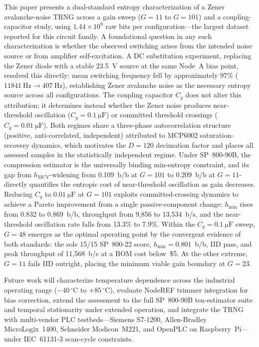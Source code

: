 \documentclass[conference]{IEEEtran}
\newcommand{\hmin}{\ensuremath{h_{\min}}}
\newcommand{\Cg}{\ensuremath{C_g}}
\newcommand{\degC}{\ensuremath{^{\circ}\mathrm{C}}}
\begin{document}
This paper presents a dual-standard entropy characterization of a
Zener avalanche-noise TRNG across a gain sweep ($G=11$ to $G=101$)
and a coupling-capacitor study, using $1.44\!\times\!10^{9}$ raw bits
per configuration---the largest dataset reported for this circuit
family. A foundational question in any such characterization is
whether the observed switching arises from the intended noise source
or from amplifier self-excitation. A DC substitution experiment,
replacing the Zener diode with a stable \SI{23.5}{\volt} source at the
same Node~A bias point, resolved this directly: mean switching
frequency fell by approximately 97\%
($\SI{11841}{\hertz}\to\SI{407}{\hertz}$), establishing Zener
avalanche noise as the necessary entropy source across all
configurations. The coupling capacitor $\Cg$ does not alter this
attribution; it determines instead whether the Zener noise produces
near-threshold oscillation ($\Cg=\SI{0.1}{\micro\farad}$) or
committed threshold crossings ($\Cg=\SI{0.01}{\micro\farad}$). Both
regimes share a three-phase autocorrelation structure (positive,
anti-correlated, independent) attributed to MCP6002 saturation-recovery
dynamics, which motivates the $D=120$ decimation factor and places all
assessed samples in the statistically independent regime. Under
SP~800-90B, the compression estimator is the universally binding
min-entropy constraint, and its gap from $h_{\mathrm{MCV}}$-widening
from 0.109~b/b at $G=101$ to 0.209~b/b at $G=11$-directly
quantifies the entropic cost of near-threshold oscillation as gain
decreases. Reducing $\Cg$ to $\SI{0.01}{\micro\farad}$ at $G=101$
exploits committed-crossing dynamics to achieve a Pareto improvement
from a single passive-component change: $\hmin$ rises from 0.832 to
0.869~b/b, throughput from 9{,}856 to 13{,}534~b/s, and the
near-threshold oscillation rate falls from 13.3\% to 7.9\%.
Within the $\Cg=\SI{0.1}{\micro\farad}$ sweep, $G=48$ emerges as the
optimal operating point by the convergent evidence of both standards:
the sole 15/15 SP~800-22 score, $\hmin=0.801$~b/b, IID pass, and
peak throughput of 11{,}568~b/s at a BOM cost below~\$5. At the other
extreme, $G=11$ fails IID outright, placing the minimum viable gain
boundary at $G=23$.

Future work will characterize temperature dependence across the
industrial operating range ($-40\,\degC$ to $+85\,\degC$), evaluate
NodeREF trimmer integration for bias correction, extend the assessment
to the full SP~800-90B ten-estimator suite and temporal stationarity
under extended operation, and integrate the TRNG with multi-vendor PLC
testbeds---Siemens S7-1200, Allen-Bradley MicroLogix~1400, Schneider
Modicon~M221, and OpenPLC on Raspberry~Pi---under IEC~61131-3
scan-cycle constraints.
\end{document}
